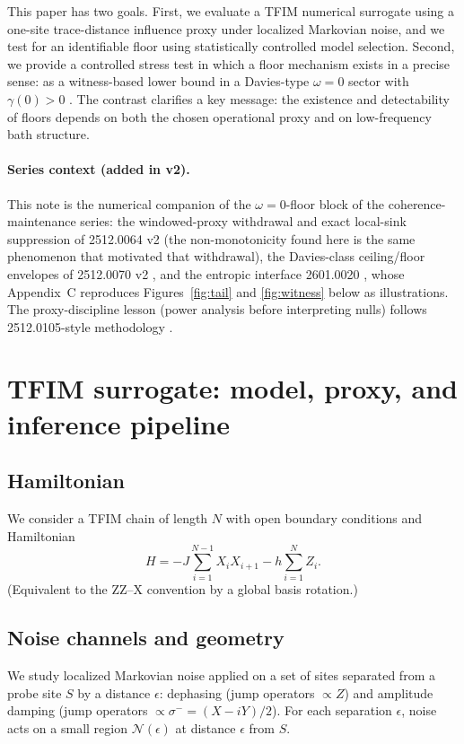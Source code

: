 \documentclass[11pt]{article}
\begin{document}
This paper has two goals. First, we evaluate a TFIM numerical surrogate
using a one-site trace-distance influence proxy under localized Markovian
noise, and we test for an identifiable floor using statistically
controlled model selection. Second, we provide a controlled stress test in
which a floor mechanism exists in a precise sense: as a witness-based
lower bound in a Davies-type $\omega = 0$ sector with $\gamma(0) > 0$
\cite{Davies, BP, Spohn}. The contrast clarifies a key message: the
existence and detectability of floors depends on both the chosen
operational proxy and on low-frequency bath structure.

\paragraph{Series context (added in v2).} This note is the numerical
companion of the $\omega = 0$-floor block of the coherence-maintenance
series: the windowed-proxy withdrawal and exact local-sink suppression of
2512.0064 v2 \cite{S0064} (the non-monotonicity found here is the same
phenomenon that motivated that withdrawal), the Davies-class
ceiling/floor envelopes of 2512.0070 v2 \cite{S0070}, and the entropic
interface 2601.0020 \cite{S0020}, whose Appendix~C reproduces
Figures~\ref{fig:tail} and \ref{fig:witness} below as illustrations. The
proxy-discipline lesson (power analysis before interpreting nulls) follows
2512.0105-style methodology \cite{S0105}.

\section{TFIM surrogate: model, proxy, and inference pipeline}
\subsection{Hamiltonian}
We consider a TFIM chain of length $N$ with open boundary conditions and
Hamiltonian
\[
H = -J\sum_{i=1}^{N-1} X_i X_{i+1} - h\sum_{i=1}^{N} Z_i .
\]
(Equivalent to the ZZ--X convention by a global basis rotation.)

\subsection{Noise channels and geometry}
We study localized Markovian noise applied on a set of sites separated
from a probe site $S$ by a distance $\epsilon$: dephasing (jump operators
$\propto Z$) and amplitude damping (jump operators $\propto \sigma^- =
(X - iY)/2$). For each separation $\epsilon$, noise acts on a small region
$\mathcal{N}(\epsilon)$ at distance $\epsilon$ from $S$.
\end{document}
